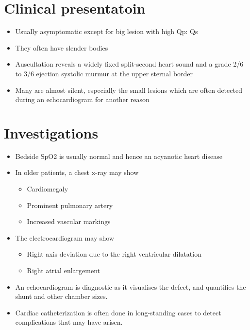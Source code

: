 \documentclass[
  letterpaper,
  DIV=11,
  numbers=noendperiod]{scrreprt}
\providecommand{\tightlist}{%
  \setlength{\itemsep}{0pt}\setlength{\parskip}{0pt}}\usepackage{longtable,booktabs,array}
\begin{document}
\hypertarget{clinical-presentatoin}{%
\section{Clinical presentatoin}\label{clinical-presentatoin}}

\begin{itemize}
\tightlist
\item
  Usually asymptomatic except for big lesion with high Qp: Qs
\item
  They often have slender bodies
\item
  Auscultation reveals a widely fixed split-second heart sound and a
  grade 2/6 to 3/6 ejection systolic murmur at the upper sternal border
\item
  Many are almost silent, especially the small lesions which are often
  detected during an echocardiogram for another reason
\end{itemize}

\hypertarget{investigations-1}{%
\section{Investigations}\label{investigations-1}}

\begin{itemize}
\tightlist
\item
  Bedside SpO2 is usually normal and hence an acyanotic heart disease
\item
  In older patients, a chest x-ray may show

  \begin{itemize}
  \tightlist
  \item
    Cardiomegaly
  \item
    Prominent pulmonary artery
  \item
    Increased vascular markings
  \end{itemize}
\item
  The electrocardiogram may show

  \begin{itemize}
  \tightlist
  \item
    Right axis deviation due to the right ventricular dilatation
  \item
    Right atrial enlargement
  \end{itemize}
\item
  An echocardiogram is diagnostic as it visualises the defect, and
  quantifies the shunt and other chamber sizes.
\item
  Cardiac catheterization is often done in long-standing cases to detect
  complications that may have arisen.
\end{itemize}
\end{document}
